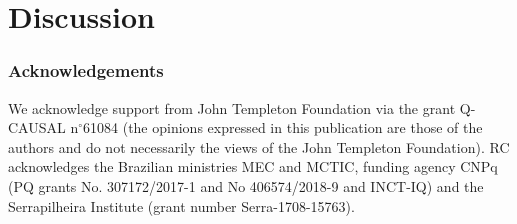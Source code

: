 \documentclass[letterpaper]{article}
\newcommand{\STAB}{\mathrm{STAB}}
\renewcommand{\TH}{\mathrm{TH}}
\begin{document}
%
%
%
\section*{Discussion}


\subsubsection*{Acknowledgements}
We acknowledge support from John Templeton Foundation via the grant Q-CAUSAL
n$^{\circ}$61084 (the opinions expressed in this publication are those of the
    authors and do not necessarily  the views of the John Templeton
Foundation). RC acknowledges the Brazilian ministries MEC and MCTIC, funding
agency CNPq (PQ grants No. 307172/2017-1 and No 406574/2018-9 and INCT-IQ) and
the Serrapilheira Institute (grant number Serra-1708-15763).
\end{document}
